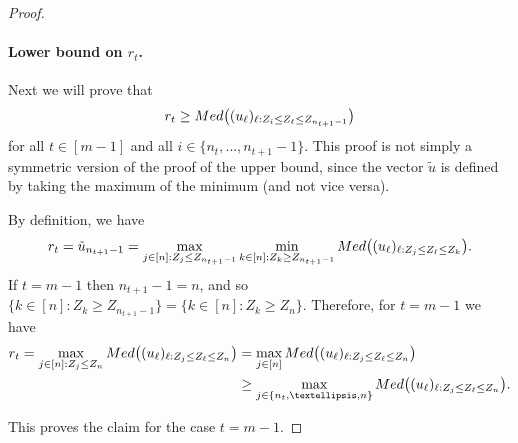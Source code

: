 \documentclass[10pt,a4paper]{amsart}
\begin{document}
\begin{proof}
    \paragraph{Lower bound on $r_t$.}
    Next we will prove that
    \begin{equation}\label{eq:cumulative-median-inequalities-2}
    r_t\geq  \textnormal{Med}\bigl((u_\ell)_{\ell:Z_i\leq Z_\ell\leq Z_{n_{t+1}-1}}\bigr)
\end{equation}
for all $t\in[m-1]$ and all $i\in\{n_t,\dots,n_{t+1}-1\}$. This proof is not simply a symmetric version of the proof of the upper bound, since the vector $\tilde{u}$ is defined by taking the maximum of the minimum (and not vice versa).

By definition, we have 
\[r_t = \tilde{u}_{n_{t+1}-1} = \max_{j\in [n]: Z_j\leq Z_{n_{t+1}-1}}\min_{k\in [n]: Z_k\geq Z_{n_{t+1}-1}} \textnormal{Med}\bigl((u_\ell)_{\ell:Z_j\leq Z_\ell\leq Z_k}\bigr).\]
If $t=m-1$ then $n_{t+1}-1=n$, and so $\{k\in[n] : Z_k \geq Z_{n_{t+1}-1}\} = \{k\in[n]: Z_k \geq Z_n\}$. Therefore, for $t=m-1$ we have
\begin{align*}
r_t = \max_{j\in [n]: Z_j\leq Z_n}\textnormal{Med}\bigl((u_\ell)_{\ell:Z_j\leq Z_\ell\leq Z_n}\bigr) &= \max_{j \in [n]} \textnormal{Med}\bigl((u_\ell)_{\ell:Z_j\leq Z_\ell\leq Z_n}\bigr) \\
&\geq \max_{j \in\{n_t,\dots,n\}}\textnormal{Med}\bigl((u_\ell)_{\ell:Z_j\leq Z_\ell\leq Z_{n}}\bigr).
\end{align*}

This proves the claim for the case $t=m-1$.


\end{proof}
\end{document}
